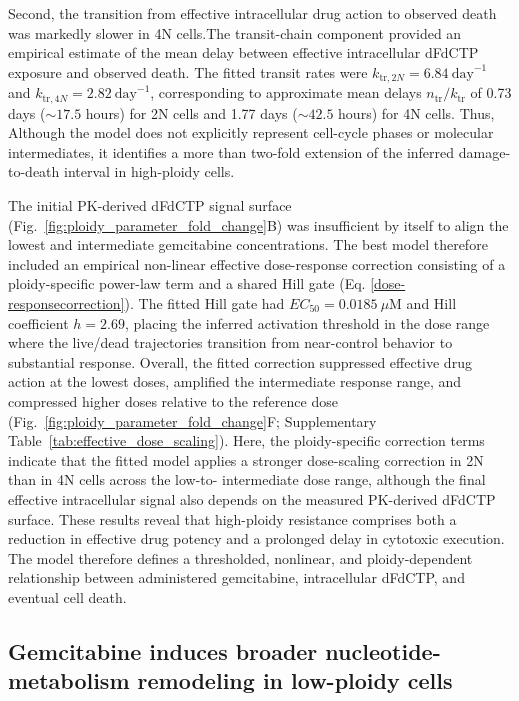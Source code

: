 \documentclass[11pt,notitlepage]{article}
\begin{document}
Second, the transition from effective intracellular drug action to observed death was markedly slower in 4N cells.The transit-chain component provided an empirical estimate of the mean delay between effective intracellular dFdCTP exposure and observed death. The fitted transit rates were \(k_{\mathrm{tr},2N}=6.84~\mathrm{day}^{-1}\) and \(k_{\mathrm{tr},4N}=2.82~\mathrm{day}^{-1}\), corresponding to approximate mean delays \(n_{\mathrm{tr}}/k_{\mathrm{tr}}\) of 0.73 days (\(\sim 17.5\) hours) for 2N cells and 1.77 days (\(\sim 42.5\) hours) for 4N cells. Thus, Although the model does not explicitly represent cell-cycle phases or molecular intermediates, it identifies a more than two-fold extension of the inferred damage-to-death interval in high-ploidy cells.




The initial PK-derived dFdCTP signal surface (Fig.~\ref{fig:ploidy_parameter_fold_change}B) was insufficient by itself to align the lowest and intermediate gemcitabine concentrations. The best model therefore included an
  empirical non-linear effective dose-response correction consisting of a ploidy-specific power-law term and a shared Hill gate (Eq. \eqref{dose-responsecorrection}). The fitted Hill gate had \(EC_{50}
  =0.0185~\mu\mathrm{M}\) and Hill coefficient \(h=2.69\), placing the inferred activation threshold in the dose range where the live/dead trajectories transition from
  near-control behavior to substantial response. Overall, the fitted correction suppressed effective drug action at the lowest doses, amplified the intermediate response
  range, and compressed higher doses relative to the reference dose (Fig.~\ref{fig:ploidy_parameter_fold_change}F; Supplementary Table~\ref{tab:effective_dose_scaling}). Here, the ploidy-specific correction terms indicate that the fitted model applies a stronger dose-scaling correction in 2N than in 4N cells across the low-to-
  intermediate dose range, although the final effective intracellular signal also depends on the measured PK-derived dFdCTP surface. These results reveal that high-ploidy resistance comprises both a reduction in effective drug potency and a prolonged delay in cytotoxic execution. The model therefore defines a thresholded, nonlinear, and ploidy-dependent relationship between administered gemcitabine, intracellular dFdCTP, and eventual cell death.



\subsection*{Gemcitabine induces broader nucleotide-metabolism remodeling in low-ploidy cells}
\end{document}
